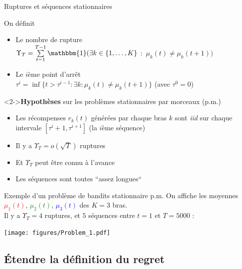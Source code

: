 \documentclass[11pt,french,ignorenonframetext,]{beamer}
\providecommand{\tightlist}{%
  \setlength{\itemsep}{0pt}\setlength{\parskip}{0pt}}
\begin{document}
\begin{frame}{Ruptures et séquences stationnaires}

  On définit

  \begin{itemize}
    \item
    Le nombre de rupture\\
    $\Upsilon_T = \sum\limits_{t=1}^{T-1} \mathbbm{1}(\exists k\in \{1,\dots,K\}$ $:$ $\mu_k(t) \neq \mu_k(t+1) )$

    \item
    Le $i$ème point d'arrêt\\
    $\tau^{i} = \inf\{t > \tau^{i-1} : \exists k : \mu_k(t) \neq \mu_k(t+1)\}$
    \hfill{} (avec $\tau^0=0$)
  \end{itemize}

  \begin{block}<2->{\textbf{Hypothèses} sur les problèmes stationnaires par morceaux (p.m.)}
    \begin{itemize}\tightlist
      \item Les récompenses $r_k(t)$ générées par chaque bras $k$ sont \alert{\emph{iid} sur chaque intervale} $[ \tau^{i} + 1, \tau^{i+1} ]$ (la $i$ème séquence)
      \item Il y a $\Upsilon_T = o(\sqrt{T})$ ruptures
      \item Et \alert{$\Upsilon_T$ peut être connu à l'avance}
      \item Les séquences sont toutes ``assez longues``
  \end{itemize}
\end{block}
\end{frame}


\begin{frame}[plain]{Exemple d'un problème de bandits stationnaire p.m.}
  On affiche les moyennes \textcolor{red}{$\mu_1(t)$}, \textcolor{green}{$\mu_2(t)$}, \textcolor{blue}{$\mu_3(t)$}
  des $K=3$ bras.\\
  Il y a $\Upsilon_T=4$ ruptures, et $5$ séquences entre $t=1$ et $T=5000$ :
  \vspace*{-20pt} %
  \begin{center}
    \texttt{[image: figures/Problem\_1.pdf]}
  \end{center}
\end{frame}


\subsection{\hfill{}Étendre la définition du regret\hfill{}}
\end{document}

